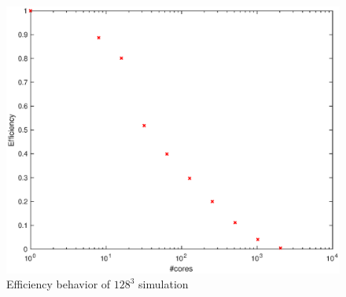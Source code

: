 \begin{figure}
\begin{center}
\includegraphics[scale=0.6]{grafici/644}
\caption{Efficiency behavior of $128^3$ simulation}
\label{644}
\end{center}
\end{figure}
